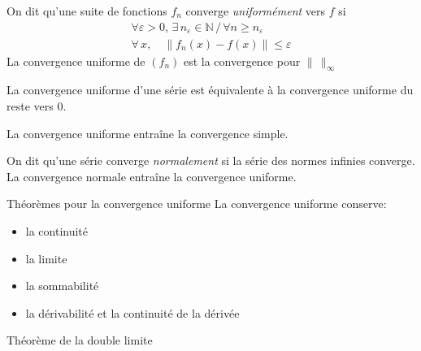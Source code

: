 \documentclass[french, a4paper, 10pt, twocolumn]{article}
\newcommand{\N}{\mathbb{N}}   %
\begin{document}
\begin{definition}
  On dit qu'une suite de fonctions $f_{n}$ converge \emph{uniformément} vers $f$ si
  \begin{align*}
    \forall \varepsilon >0,\,\exists\, n_{\varepsilon}\in\N \,\slash\, \forall n\geqslant n_{\varepsilon} \\
    \forall\, x,\quad \left\lVert f_{n}(x)-f(x)\right\rVert \leqslant \varepsilon
  \end{align*}
  La convergence uniforme de $(f_{n})$ est la convergence pour $\lVert\,\rVert_{\infty}$

  La convergence uniforme d'une série est équivalente à la convergence uniforme du reste vers $0$.

  La convergence uniforme entraîne la convergence simple.
\end{definition}

\begin{definition}
  On dit qu'une série converge \emph{normalement} si la série des normes infinies converge.
  La convergence normale entraîne la convergence uniforme.
\end{definition}

\begin{theoreme}{Théorèmes pour la convergence uniforme}
  La convergence uniforme conserve:
  \begin{itemize}
    \item la continuité
    \item la limite
    \item la sommabilité
    \item la dérivabilité et la continuité de la dérivée
  \end{itemize}
\end{theoreme}

\begin{theoreme}{Théorème de la double limite}

\end{theoreme}
\end{document}
